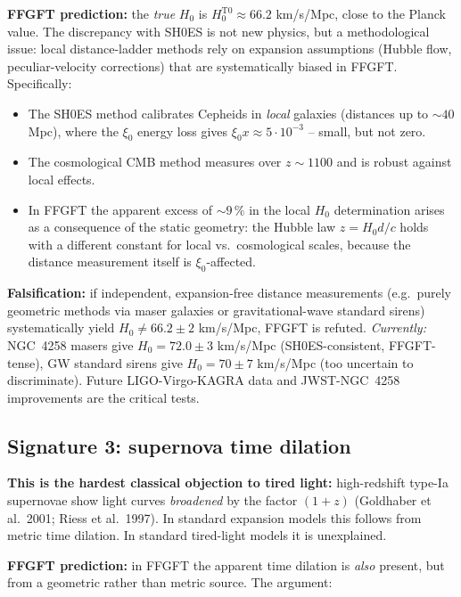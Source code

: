 \textbf{FFGFT prediction:} the \emph{true} $H_0$ is
$H_0^{\text{T0}} \approx 66.2$ km/s/Mpc, close to the Planck value.
The discrepancy with SH0ES is not new physics, but a methodological
issue: local distance-ladder methods rely on expansion assumptions
(Hubble flow, peculiar-velocity corrections) that are systematically
biased in FFGFT. Specifically:
\begin{itemize}[leftmargin=2em,itemsep=2pt,topsep=2pt]
  \item The SH0ES method calibrates Cepheids in \emph{local}
        galaxies (distances up to $\sim 40$ Mpc), where the
        $\xi_0$ energy loss gives $\xi_0 x \approx 5\!\cdot\!10^{-3}$
        -- small, but not zero.
  \item The cosmological CMB method measures over $z \sim 1100$ and
        is robust against local effects.
  \item In FFGFT the apparent excess of $\sim 9\,\%$ in the local
        $H_0$ determination arises as a consequence of the static
        geometry: the Hubble law $z = H_0 d/c$ holds with a different
        constant for local vs.\ cosmological scales, because the
        distance measurement itself is $\xi_0$-affected.
\end{itemize}

\textbf{Falsification:} if independent, expansion-free distance
measurements (e.g.\ purely geometric methods via maser galaxies or
gravitational-wave standard sirens) systematically yield
$H_0 \neq 66.2 \pm 2$ km/s/Mpc, FFGFT is refuted. \emph{Currently:}
NGC~4258 masers give $H_0 = 72.0 \pm 3$ km/s/Mpc (SH0ES-consistent,
FFGFT-tense), GW standard sirens give $H_0 = 70 \pm 7$ km/s/Mpc (too
uncertain to discriminate). Future LIGO-Virgo-KAGRA data and
JWST-NGC~4258 improvements are the critical tests.

\subsection{Signature 3: supernova time dilation}

\textbf{This is the hardest classical objection to tired light:}
high-redshift type-Ia supernovae show light curves \emph{broadened}
by the factor $(1+z)$ (Goldhaber et al.\ 2001; Riess et al.\ 1997).
In standard expansion models this follows from metric time dilation.
In standard tired-light models it is unexplained.

\textbf{FFGFT prediction:} in FFGFT the apparent time dilation is
\emph{also} present, but from a geometric rather than metric source.
The argument:

